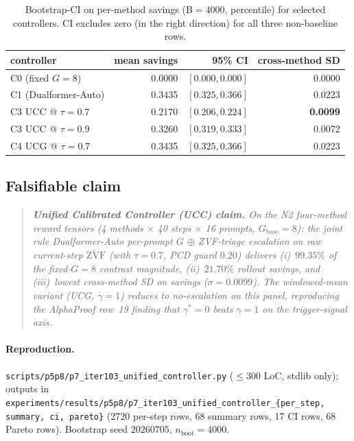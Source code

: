 \documentclass{article}
\newcommand{\zvf}{\ensuremath{\widetilde{\mathrm{ZVF}}}}
\begin{document}
\begin{table}[t]
\centering\small
\caption{Bootstrap-CI on per-method savings (B$=4000$, percentile) for
selected controllers.  CI excludes zero (in the right direction) for
all three non-baseline rows.}
\label{tab:p7-iter103-ci}
\vspace{2pt}
\begin{tabular}{lrrr}
\toprule
controller & mean savings & 95\% CI & cross-method SD \\
\midrule
C0 (fixed $G{=}8$)        &  0.0000 & $[0.000, 0.000]$ & 0.0000 \\
C1 (Dualformer-Auto)      &  0.3435 & $[0.325, 0.366]$ & 0.0223 \\
C3 UCC @ $\tau{=}0.7$    &  0.2170 & $[0.206, 0.224]$ & \textbf{0.0099} \\
C3 UCC @ $\tau{=}0.9$    &  0.3260 & $[0.319, 0.333]$ & 0.0072 \\
C4 UCG @ $\tau{=}0.7$    &  0.3435 & $[0.325, 0.366]$ & 0.0223 \\
\bottomrule
\end{tabular}
\end{table}

\subsection{Falsifiable claim}

\begin{quote}\itshape
\textbf{Unified Calibrated Controller (UCC) claim.}
On the N2 four-method reward tensors (4 methods $\times$ 40 steps
$\times$ 16 prompts, $G_{\mathrm{base}}{=}8$):
the joint rule \emph{Dualformer-Auto per-prompt $G$ $\oplus$
ZVF-triage escalation on raw current-step $\zvf$ (with $\tau{=}0.7$,
PCD guard $0.20$)}
delivers (i)~$99.35\%$ of the fixed-$G{=}8$ contrast magnitude, (ii)~$21.70\%$
rollout savings, and (iii)~lowest cross-method SD on savings
($\sigma{=}0.0099$).  The windowed-mean variant (UCG, $\gamma{=}1$)
reduces to no-escalation on this panel, reproducing the AlphaProof row~19
finding that $\gamma^*{=}0$ beats $\gamma{=}1$ on the
trigger-signal axis.
\end{quote}

\paragraph{Reproduction.}
\texttt{scripts/p5p8/p7\_iter103\_unified\_controller.py}
($\le 300$ LoC, stdlib only); outputs in
\texttt{experiments/results/p5p8/p7\_iter103\_unified\_controller\_\{per\_step, summary, ci, pareto\}} (2720 per-step rows, 68 summary rows,
17 CI rows, 68 Pareto rows).
Bootstrap seed $20260705$, $n_{\mathrm{boot}}{=}4000$.
\end{document}
